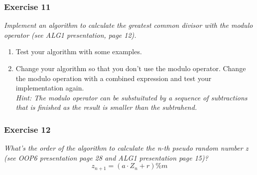 \subsubsection*{Exercise 11}
\textit{Implement an algorithm to calculate the greatest common divisor
with the modulo operator (see ALG1 presentation, page 12).}\\



\begin{enumerate}[label={(\alph*)}]
	\item Test your algorithm with some examples.
	\item Change your algorithm so that you don't use the modulo operator. 
		Change the modulo operation with a combined expression and test 
		your implementation again. \\
		\textit{Hint: The modulo operator can be substuituted by a 
			sequence of subtractions that is finished as the 
			result is smaller than the subtrahend.}
		

\end{enumerate}

\subsubsection*{Exercise 12}
\textit{What's the order of the algorithm to calculate the n-th pseudo random 
number z (see OOP6 presentation page 28 and ALG1 presentation page 15)?}\\

\[ z_{n+1} = (a \cdot Z_n + r) \% m \]
